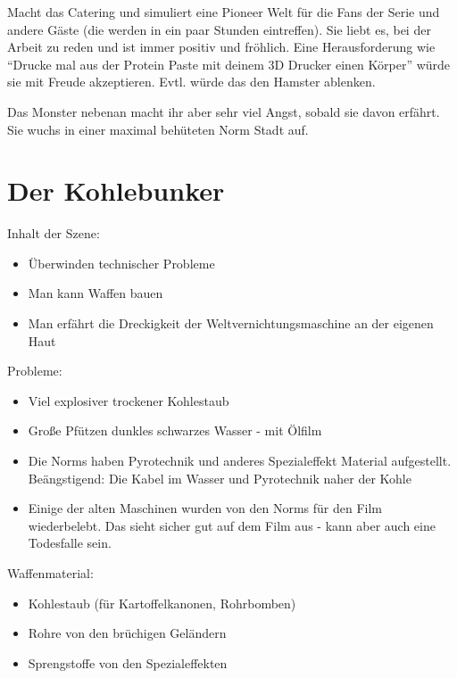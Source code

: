 \begin{npcBox}[title=Cherie]
    \begin{npcDescription}
    Macht das Catering und simuliert eine Pioneer Welt für die Fans der Serie und andere Gäste (die werden in ein paar Stunden eintreffen).
    Sie liebt es, bei der Arbeit zu reden und ist immer positiv und fröhlich. Eine Herausforderung wie \enquote{Drucke mal aus der Protein Paste mit deinem 3D Drucker einen Körper} würde sie mit Freude akzeptieren. Evtl. würde das den Hamster ablenken.

    Das Monster nebenan macht ihr aber sehr viel Angst, sobald sie davon erfährt. Sie wuchs in einer maximal behüteten Norm Stadt auf.

    \end{npcDescription}

\end{npcBox}



\section{Der Kohlebunker}

Inhalt der Szene:
\begin{itemize}
\item Überwinden technischer Probleme
\item Man kann Waffen bauen
\item Man erfährt die Dreckigkeit der Weltvernichtungsmaschine an der eigenen Haut
\end{itemize}

Probleme:

\begin{itemize}
\item Viel explosiver trockener Kohlestaub
\item Große Pfützen dunkles schwarzes Wasser - mit Ölfilm
\item Die Norms haben Pyrotechnik und anderes Spezialeffekt Material aufgestellt. Beängstigend: Die Kabel im Wasser und Pyrotechnik naher der Kohle
\item Einige der alten Maschinen wurden von den Norms für den Film wiederbelebt. Das sieht sicher gut auf dem Film aus - kann aber auch eine Todesfalle sein.
\end{itemize}

Waffenmaterial:

\begin{itemize}
\item Kohlestaub (für Kartoffelkanonen, Rohrbomben)
\item Rohre von den brüchigen Geländern
\item Sprengstoffe von den Spezialeffekten
\end{itemize}


